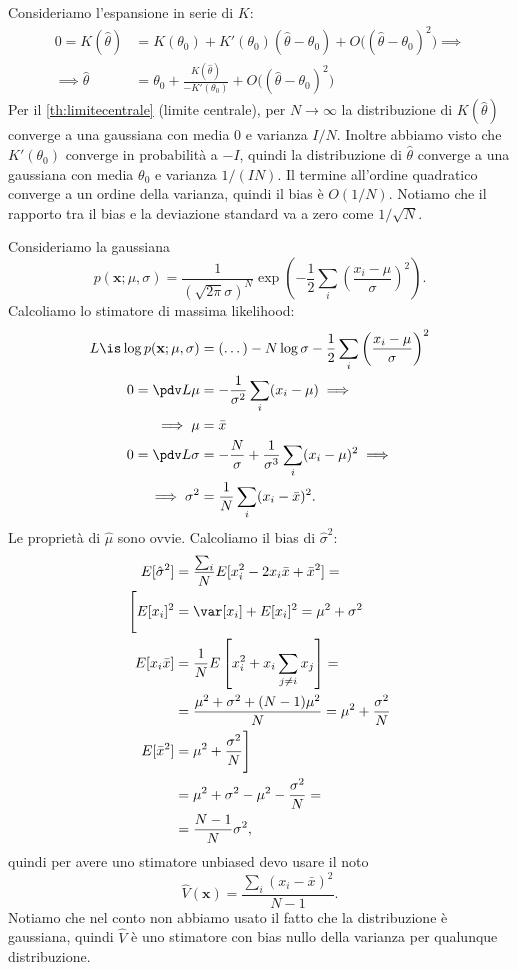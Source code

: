 Consideriamo l'espansione in serie di $K$:
\begin{align*}
	0 = K(\hat\theta)
	&= K(\theta_0) + K'(\theta_0)(\hat\theta-\theta_0) + O\big((\hat\theta-\theta_0)^2\big) \implies \\
	\implies \hat\theta
	&= \theta_0 + \frac{K(\hat\theta)}{-K'(\theta_0)} + O\big((\hat\theta-\theta_0)^2\big)
\end{align*}
Per il \autoref{th:limitecentrale} (limite centrale),
per $N\to\infty$
la distribuzione di $K(\hat\theta)$ converge a una gaussiana
con media 0 e varianza $I/N$.
Inoltre abbiamo visto che $K'(\theta_0)$ converge in probabilità a $-I$,
quindi la distribuzione di $\hat\theta$ converge a una gaussiana
con media $\theta_0$ e varianza $1/(IN)$.
Il termine all'ordine quadratico converge a un ordine della varianza,
quindi il bias è $O(1/N)$.
Notiamo che il rapporto tra il bias e la deviazione standard va a zero come $1/\sqrt{N}$.

\begin{example}
	Consideriamo la gaussiana
	\begin{equation*}
		p(\mathbf x;\mu,\sigma)
		= \frac1{(\sqrt{2\pi}\sigma)^N} \exp \left( -\frac12\sum_i\left(\frac{x_i-\mu}\sigma\right)^2 \right).
	\end{equation*}
	Calcoliamo lo stimatore di massima likelihood:
	\begin{align*}
		L \is \log p(\mathbf x;\mu,\sigma)
		&= (\dots) - N\log\sigma - \frac12 \sum_i \left( \frac{x_i-\mu}\sigma \right)^2 \\
		0 = \pdv L\mu
		&= -\frac1{\sigma^2}\sum_i (x_i-\mu) \implies \\
		\implies \mu
		&= \bar x \\
		0 = \pdv L\sigma
		&= -\frac N\sigma + \frac1{\sigma^3}\sum_i (x_i-\mu)^2 \implies \\
		\implies \sigma^2
		&= \frac1N \sum_i (x_i-\bar x)^2.
	\end{align*}
	Le proprietà di $\hat\mu$ sono ovvie.
	Calcoliamo il bias di $\hat\sigma^2$:
	\begin{align*}
		E[\hat\sigma^2]
		&= \frac{\sum_i}N E[x_i^2 - 2x_i\bar x + \bar x^2] = \\
		\Bigg[ E[x_i]^2
		&= \var[x_i] + E[x_i]^2
		= \mu^2 + \sigma^2 \\
		E[x_i\bar x]
		&= \frac 1N E \left[ x_i^2 + x_i \sum_{j\neq i} x_j \right] = \\
		&= \frac{\mu^2 + \sigma^2 + (N-1)\mu^2}N
		= \mu^2 + \frac{\sigma^2}N \\
		E[\bar x^2]
		&= \mu^2 + \frac{\sigma^2}N \Bigg] \\
		&= \mu^2 + \sigma^2 - \mu^2 - \frac{\sigma^2}N = \\
		&= \frac{N-1}N \sigma^2,
	\end{align*}
	quindi per avere uno stimatore unbiased devo usare il noto
	\begin{equation*}
		\hat V(\mathbf x)
		= \frac{\sum_i (x_i-\bar x)^2}{N-1}.
	\end{equation*}
	Notiamo che nel conto non abbiamo usato il fatto che la distribuzione è gaussiana,
	quindi $\hat V$ è uno stimatore con bias nullo della varianza per qualunque distribuzione.
\end{example}

